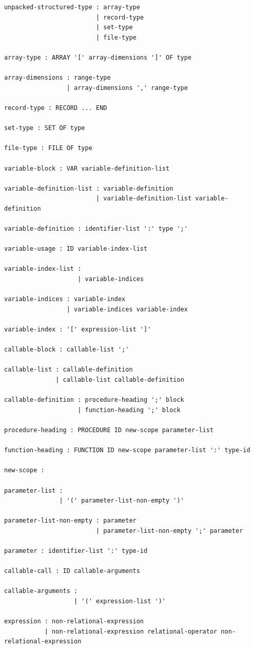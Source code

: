 \documentclass[12pt, a4paper]{article}
\begin{document}
\begin{lstlisting}
unpacked-structured-type : array-type
                         | record-type
                         | set-type
                         | file-type

array-type : ARRAY '[' array-dimensions ']' OF type

array-dimensions : range-type
                 | array-dimensions ',' range-type

record-type : RECORD ... END

set-type : SET OF type

file-type : FILE OF type

variable-block : VAR variable-definition-list

variable-definition-list : variable-definition
                         | variable-definition-list variable-definition

variable-definition : identifier-list ':' type ';'

variable-usage : ID variable-index-list

variable-index-list :
                    | variable-indices

variable-indices : variable-index
                 | variable-indices variable-index

variable-index : '[' expression-list ']'

callable-block : callable-list ';'

callable-list : callable-definition
              | callable-list callable-definition

callable-definition : procedure-heading ';' block
                    | function-heading ';' block

procedure-heading : PROCEDURE ID new-scope parameter-list

function-heading : FUNCTION ID new-scope parameter-list ':' type-id

new-scope :

parameter-list :
               | '(' parameter-list-non-empty ')'

parameter-list-non-empty : parameter
                         | parameter-list-non-empty ';' parameter

parameter : identifier-list ':' type-id

callable-call : ID callable-arguments

callable-arguments :
                   | '(' expression-list ')'

expression : non-relational-expression
           | non-relational-expression relational-operator non-relational-expression


\end{lstlisting}
\end{document}
